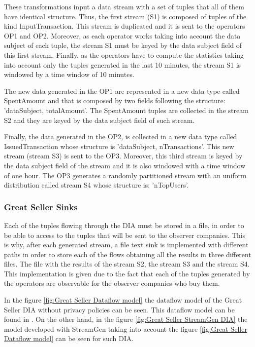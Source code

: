These transformations input a data stream with a set of tuples that all of them have identical structure. Thus, the first stream (S1) is composed of tuples of the kind InputTransaction. This stream is duplicated and it is sent to the operators OP1 and OP2. Moreover, as each operator works taking into account the data subject of each tuple, the stream S1 must be keyed by the data subject field of this first stream. Finally, as the operators have to compute the statistics taking into account only the tuples generated in the last 10 minutes, the stream S1 is windowed by a time window of 10 minutes.

The new data generated in the OP1 are represented in a new data type called SpentAmount and that is composed by two fields following the structure: 'dataSubject, totalAmount'. The SpentAmount tuples are collected in the stream S2 and they are keyed by the data subject field of such stream.

Finally, the data generated in the OP2, is collected in a new data type called IssuedTransaction whose structure is 'dataSubject, nTransactions'. This new stream (stream S3) is sent to the OP3. Moreover, this third stream is keyed by the data subject field of the stream and it is also windowed with a time window of one hour. The OP3 generates a randomly partitioned stream with an uniform distribution called stream S4 whose structure is: 'nTopUsers'.

\subsubsection*{Great Seller Sinks}
Each of the tuples flowing through the DIA must be stored in a file, in order to be able to access to the tuples that will be sent to the observer companies. This is why, after each generated stream, a file text sink is implemented with different paths in order to store each of the flows obtaining all the results in three different files. The file with the results of the stream S2, the stream S3 and the stream S4.
This implementation is given due to the fact that each of the tuples generated by the operators are observable for the observer companies who buy them.

In the figure \ref{fig:Great Seller Dataflow model} the dataflow model of the Great Seller DIA without privacy policies can be seen. This dataflow model can be found in \cite{privacypoliciesarticle}. On the other hand, in the figure \ref{fig:Great Seller StreamGen DIA} the model developed with StreamGen taking into account the figure \ref{fig:Great Seller Dataflow model} can be seen for such DIA.

